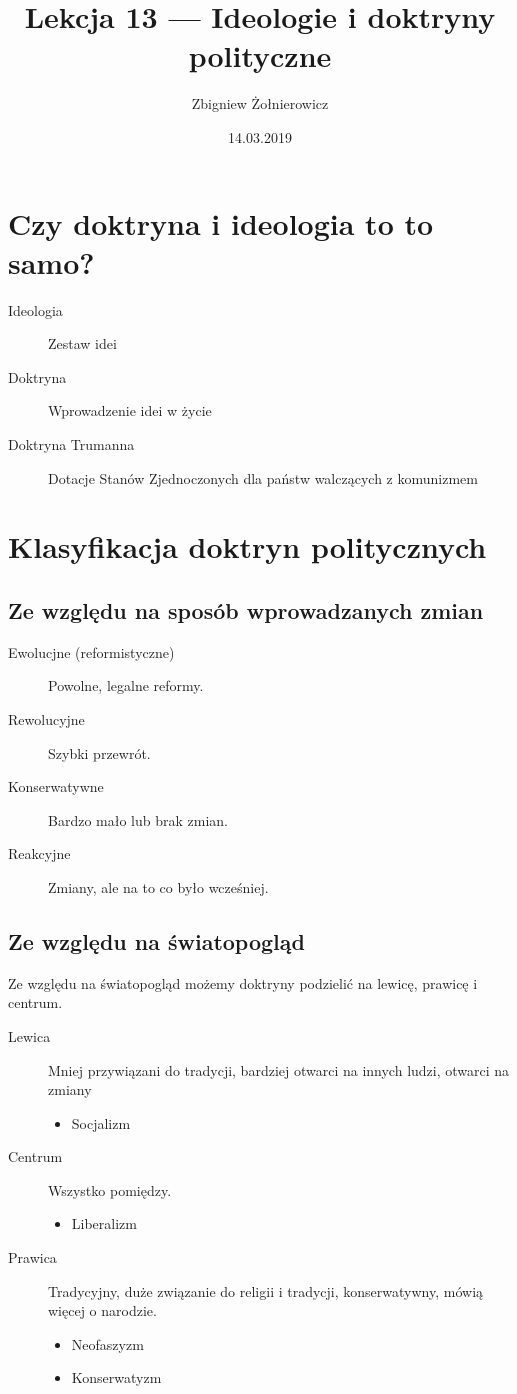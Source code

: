 \documentclass[a4paper]{article}
\begin{document}
\title{Lekcja 13 --- Ideologie i doktryny polityczne}
\author{Zbigniew Żołnierowicz}
\date{14.03.2019}
\maketitle
\section{Czy doktryna i ideologia to to samo?}
\begin{description}
  \item[Ideologia] Zestaw idei
  \item[Doktryna] Wprowadzenie idei w życie
  \item[Doktryna Trumanna] Dotacje Stanów Zjednoczonych dla państw walczących z komunizmem
\end{description}
\section{Klasyfikacja doktryn politycznych}
\subsection{Ze względu na sposób wprowadzanych zmian}
\begin{description}
  \item[Ewolucjne (reformistyczne)] Powolne, legalne reformy.
  \item[Rewolucyjne] Szybki przewrót.
  \item[Konserwatywne] Bardzo mało lub brak zmian.
  \item[Reakcyjne] Zmiany, ale na to co było wcześniej.
\end{description}
\subsection{Ze względu na światopogląd}
Ze względu na światopogląd możemy doktryny podzielić na lewicę, prawicę i centrum.
\begin{description}
  \item[Lewica] Mniej przywiązani do tradycji, bardziej otwarci na innych ludzi, otwarci na zmiany
    \begin{itemize}
      \item Socjalizm
    \end{itemize}
  \item[Centrum] Wszystko pomiędzy.
    \begin{itemize}
      \item Liberalizm
    \end{itemize}
  \item[Prawica] Tradycyjny, duże związanie do religii i tradycji, konserwatywny, mówią więcej o narodzie.
    \begin{itemize}
      \item Neofaszyzm
      \item Konserwatyzm
    \end{itemize}
\end{description}
\end{document}
